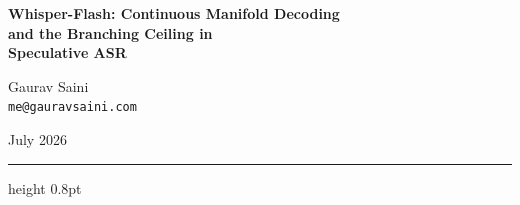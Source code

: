 \documentclass[11pt,a4paper]{article}
\begin{document}
\begin{center}
    {\LARGE\bfseries Whisper-Flash: Continuous Manifold Decoding\\[4pt]
    and the Branching Ceiling in\\[4pt]
    Speculative ASR}

    \vspace{1.2em}
    {\large Gaurav Saini}\\[4pt]
    {\normalsize \texttt{me@gauravsaini.com}}

    \vspace{0.6em}
    {\normalsize July 2026}
\end{center}

\vspace{1em}
\hrule height 0.8pt
\vspace{1.5em}
\end{document}
